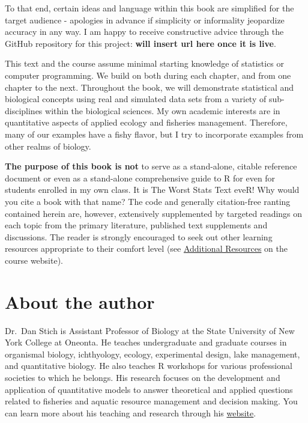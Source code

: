 \documentclass[
]{book}
\begin{document}
To that end, certain ideas and language within this book are simplified for the target audience - apologies in advance if simplicity or informality jeopardize accuracy in any way. I am happy to receive constructive advice through the GitHub repository for this project: \textbf{will insert url here once it is live}.

This text and the course assume minimal starting knowledge of statistics or computer programming. We build on both during each chapter, and from one chapter to the next. Throughout the book, we will demonstrate statistical and biological concepts using real and simulated data sets from a variety of sub-disciplines within the biological sciences. My own academic interests are in quantitative aspects of applied ecology and fisheries management. Therefore, many of our examples have a fishy flavor, but I try to incorporate examples from other realms of biology.

\textbf{The purpose of this book is not} to serve as a stand-alone, citable reference document or even as a stand-alone comprehensive guide to R for even for students enrolled in my own class. It is The Worst Stats Text eveR! Why would you cite a book with that name? The code and generally citation-free ranting contained herein are, however, extensively supplemented by targeted readings on each topic from the primary literature, published text supplements and discussions. The reader is strongly encouraged to seek out other learning resources appropriate to their comfort level (see \href{https://danstich.github.io/stich/classes/BIOL217/index.html}{Additional Resources} on the course website).

\hypertarget{author}{%
\chapter*{About the author}\label{author}}

Dr.~Dan Stich is Assistant Professor of Biology at the State University of New York College at Oneonta. He teaches undergraduate and graduate courses in organismal biology, ichthyology, ecology, experimental design, lake management, and quantitative biology. He also teaches R workshops for various professional societies to which he belongs. His research focuses on the development and application of quantitative models to answer theoretical and applied questions related to fisheries and aquatic resource management and decision making. You can learn more about his teaching and research through his \href{https://danstich.github.io/stich/index.html}{website}.
\end{document}
